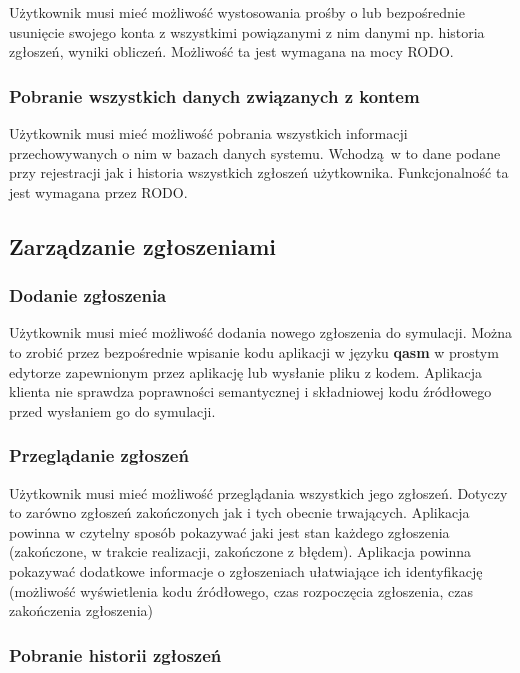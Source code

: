 Użytkownik musi mieć możliwość wystosowania prośby o lub bezpośrednie usunięcie
swojego konta z wszystkimi powiązanymi z nim danymi np. historia zgłoszeń, wyniki obliczeń.
Możliwość ta jest wymagana na mocy RODO.

\subsubsection{Pobranie wszystkich danych związanych z kontem}

Użytkownik musi mieć możliwość pobrania wszystkich informacji przechowywanych o nim
w bazach danych systemu. Wchodzą w to dane podane przy rejestracji jak i
historia wszystkich zgłoszeń użytkownika. 
Funkcjonalność ta jest wymagana przez RODO.

\subsection{Zarządzanie zgłoszeniami}

\subsubsection{Dodanie zgłoszenia}

Użytkownik musi mieć możliwość dodania nowego zgłoszenia do symulacji.
Można to zrobić przez bezpośrednie wpisanie kodu aplikacji w języku \textbf{qasm}
w prostym edytorze zapewnionym przez aplikację lub wysłanie pliku z kodem.
Aplikacja klienta nie sprawdza poprawności semantycznej i składniowej kodu źródłowego
przed wysłaniem go do symulacji.

\subsubsection{Przeglądanie zgłoszeń}

Użytkownik musi mieć możliwość przeglądania wszystkich jego zgłoszeń.
Dotyczy to zarówno zgłoszeń zakończonych jak i tych obecnie trwających.
Aplikacja powinna w czytelny sposób pokazywać jaki jest stan każdego zgłoszenia
(zakończone, w trakcie realizacji, zakończone z błędem).
Aplikacja powinna pokazywać dodatkowe informacje o zgłoszeniach ułatwiające
ich identyfikację (możliwość wyświetlenia kodu źródłowego, czas rozpoczęcia zgłoszenia,
czas zakończenia zgłoszenia)

\subsubsection{Pobranie historii zgłoszeń}

